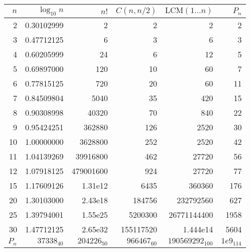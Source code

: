 \begin{center}
    \begin{tabular}{|r|r|r|r|r|r|}  
        \hline
        \rowcolor{gray!20}
        $n$         & $\log_{10}n$  & $n!$          & $C(n,n/2)$    & $\mathrm{LCM}(1...n)$ & $P_n$         \\ \hline  
        2           & 0.30102999    & 2             & 2             & 2                     & 2             \\ \hline 
        3           & 0.47712125    & 6             & 3             & 6                     & 3             \\ \hline 
        4           & 0.60205999    & 24            & 6             & 12                    & 5             \\ \hline 
        5           & 0.69897000    & 120           & 10            & 60                    & 7             \\ \hline 
        6           & 0.77815125    & 720           & 20            & 60                    & 11            \\ \hline 
        7           & 0.84509804    & 5040          & 35            & 420                   & 15            \\ \hline 
        8           & 0.90308998    & 40320         & 70            & 840                   & 22            \\ \hline 
        9           & 0.95424251    & 362880        & 126           & 2520                  & 30            \\ \hline 
        10          & 1.00000000    & 3628800       & 252           & 2520                  & 42            \\ \hline 
        11          & 1.04139269    & 39916800      & 462           & 27720                 & 56            \\ \hline 
        12          & 1.07918125    & 479001600     & 924           & 27720                 & 77            \\ \hline 
        15          & 1.17609126    & 1.31e12       & 6435          & 360360                & 176           \\ \hline 
        20          & 1.30103000    & 2.43e18       & 184756        & 232792560             & 627           \\ \hline 
        25          & 1.39794001    & 1.55e25       & 5200300       & 26771144400           & 1958          \\ \hline 
        30          & 1.47712125    & 2.65e32       & 155117520     & 1.444e14              & 5604          \\ \hline 
        $P_n$       & $37338_{40}$  & $204226_{50}$ & $966467_{60}$ & $190569292_{100}$     & $1e9_{114}$   \\ \hline 
    \end{tabular}\\
\end{center}
